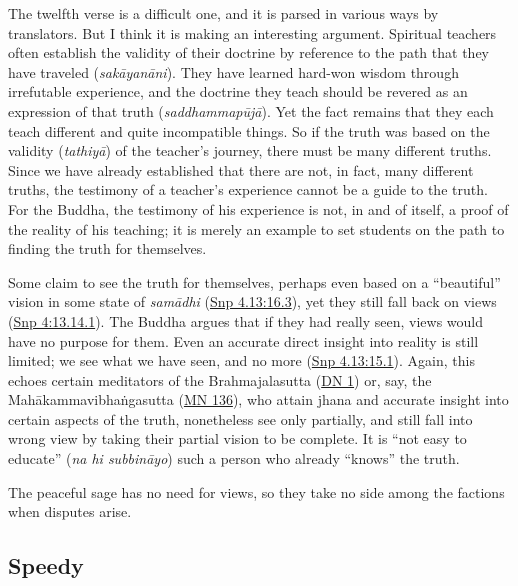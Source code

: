 \documentclass[12pt,openany]{book}%
\begin{document}
The twelfth verse is a difficult one, and it is parsed in various ways by translators. But I think it is making an interesting argument. Spiritual teachers often establish the validity of their doctrine by reference to the path that they have traveled (\textit{\textsanskrit{sakāyanāni}}). They have learned hard-won wisdom through irrefutable experience, and the doctrine they teach should be revered as an expression of that truth (\textit{\textsanskrit{saddhammapūjā}}). Yet the fact remains that they each teach different and quite incompatible things. So if the truth was based on the validity (\textit{\textsanskrit{tathiyā}}) of the teacher’s journey, there must be many different truths. Since we have already established that there are not, in fact, many different truths, the testimony of a teacher’s experience cannot be a guide to the truth. For the Buddha, the testimony of his experience is not, in and of itself, a proof of the reality of his teaching; it is merely an example to set students on the path to finding the truth for themselves.

Some claim to see the truth for themselves, perhaps even based on a “beautiful” vision in some state of \textit{\textsanskrit{samādhi}} (\href{https://suttacentral.net/snp4.13/en/sujato\#16.3}{Snp 4.13:16.3}), yet they still fall back on views (\href{https://suttacentral.net/snp4/en/sujato\#13.14.1}{Snp 4:13.14.1}). The Buddha argues that if they had really seen, views would have no purpose for them. Even an accurate direct insight into reality is still limited; we see what we have seen, and no more (\href{https://suttacentral.net/snp4.13/en/sujato\#15.1}{Snp 4.13:15.1}). Again, this echoes certain meditators of the Brahmajalasutta (\href{https://suttacentral.net/dn1/en/sujato}{DN 1}) or, say, the \textsanskrit{Mahākammavibhaṅgasutta} (\href{https://suttacentral.net/mn136/en/sujato}{MN 136}), who attain jhana and accurate insight into certain aspects of the truth, nonetheless see only partially, and still fall into wrong view by taking their partial vision to be complete. It is “not easy to educate” (\textit{na hi \textsanskrit{subbināyo}}) such a person who already “knows” the truth.

The peaceful sage has no need for views, so they take no side among the factions when disputes arise.

\subsection*{Speedy}
\end{document}
